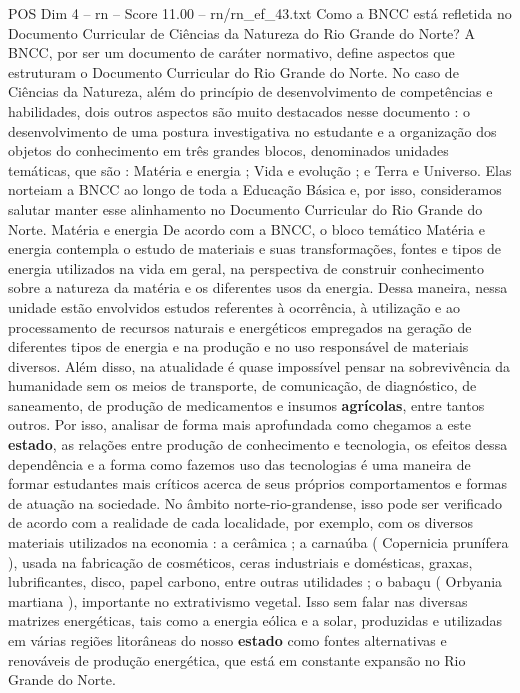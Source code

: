 \begin{textsample}{POS Dim 4 – rn – Score 11.00 – rn/rn\_ef\_43.txt}  \label{ex:f4_pos_086}
Como a BNCC está refletida no Documento Curricular de Ciências da Natureza do Rio Grande do Norte?
A BNCC, por ser um documento de caráter normativo, define aspectos que estruturam o Documento Curricular do Rio Grande do Norte.
No caso de Ciências da Natureza, além do princípio de desenvolvimento de competências e habilidades, dois outros aspectos são muito destacados nesse documento : o desenvolvimento de uma postura investigativa no estudante e a organização dos objetos do conhecimento em três grandes blocos, denominados unidades temáticas, que são : Matéria e energia ; Vida e evolução ; e Terra e Universo.
Elas norteiam a BNCC ao longo de toda a Educação Básica e, por isso, consideramos salutar manter esse alinhamento no Documento Curricular do Rio Grande do Norte.
Matéria e energia De acordo com a BNCC, o bloco temático Matéria e energia contempla o estudo de materiais e suas transformações, fontes e tipos de energia utilizados na vida em geral, na perspectiva de construir conhecimento sobre a natureza da matéria e os diferentes usos da energia.
Dessa maneira, nessa unidade estão envolvidos estudos referentes à ocorrência, à utilização e ao processamento de recursos naturais e energéticos empregados na geração de diferentes tipos de energia e na produção e no uso responsável de materiais diversos.
Além disso, na atualidade é quase impossível pensar na sobrevivência da humanidade sem os meios de transporte, de comunicação, de diagnóstico, de saneamento, de produção de medicamentos e insumos \textbf{agrícolas}, entre tantos outros.
Por isso, analisar de forma mais aprofundada como chegamos a este \textbf{estado}, as relações entre produção de conhecimento e tecnologia, os efeitos dessa dependência e a forma como fazemos uso das tecnologias é uma maneira de formar estudantes mais críticos acerca de seus próprios comportamentos e formas de atuação na sociedade.
No âmbito norte-rio-grandense, isso pode ser verificado de acordo com a realidade de cada localidade, por exemplo, com os diversos materiais utilizados na economia : a cerâmica ; a carnaúba ( Copernicia prunífera ), usada na fabricação de cosméticos, ceras industriais e domésticas, graxas, lubrificantes, disco, papel carbono, entre outras utilidades ; o babaçu ( Orbyania martiana ), importante no extrativismo vegetal.
Isso sem falar nas diversas matrizes energéticas, tais como a energia eólica e a solar, produzidas e utilizadas em várias regiões litorâneas do nosso \textbf{estado} como fontes alternativas e renováveis de produção energética, que está em constante expansão no Rio Grande do Norte.

\end{textsample}

